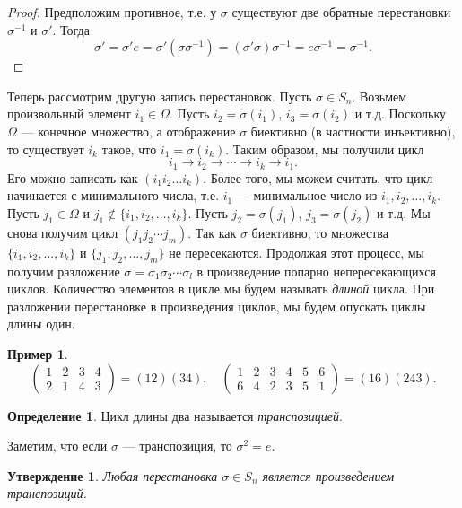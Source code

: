 \documentclass[12pt, titlepage, oneside]{amsbook}
\newtheorem{claim}[theorem]{Утверждение}
\theoremstyle{definition}
\newtheorem{example}[theorem]{Пример}
\newtheorem{definition}[theorem]{Определение}
\theoremstyle{remark}
\begin{document}
\begin{proof}
	Предположим противное, т.е. у $\sigma$ существуют две обратные перестановки $\sigma^{-1}$ и $\sigma'$. Тогда $$\sigma'=\sigma' e=\sigma'(\sigma\sigma^{-1})=(\sigma'\sigma)\sigma^{-1}=e\sigma^{-1}=\sigma^{-1}.$$
\end{proof}

Теперь рассмотрим другую запись перестановок. Пусть $\sigma\in S_n$. Возьмем произвольный элемент $i_1\in \Omega$. Пусть $i_2=\sigma(i_1)$, $i_3=\sigma(i_2)$ и т.д. Поскольку $\Omega$ --- конечное множество, а отображение $\sigma$ биективно (в частности инъективно), то существует $i_k$ такое, что $i_1=\sigma(i_k)$. Таким образом, мы получили цикл $$i_1\rightarrow i_2\rightarrow\cdots\rightarrow i_k\rightarrow i_1.$$ Его можно записать как $(i_1 i_2\ldots i_k)$. Более того, мы можем считать, что цикл начинается с минимального числа, т.е. $i_1$ --- минимальное число из $i_1,i_2,\ldots, i_k$. Пусть $j_1\in\Omega$ и $j_1\not\in\{i_1,i_2,\ldots,i_k\}$. Пусть $j_2=\sigma(j_1)$, $j_3=\sigma(j_2)$ и т.д. Мы снова получим цикл $(j_1 j_2\cdots j_m)$. Так как $\sigma$ биективно, то множества  $\{i_1,i_2,\ldots,i_k\}$ и  $\{j_1,j_2,\ldots,j_m\}$ не пересекаются. Продолжая этот процесс, мы получим разложение $\sigma=\sigma_1 \sigma_2\cdots \sigma_l$ в произведение попарно непересекающихся циклов. Количество элементов в цикле мы будем называть \emph{длиной} цикла. При разложении перестановке в произведения циклов, мы будем опускать циклы длины один.
\begin{example}
	$$\begin{pmatrix} 1 & 2 & 3 & 4 \\
                2 & 1 & 4 & 3\end{pmatrix}=(12)(34),\quad \begin{pmatrix} 1 & 2 & 3 & 4 & 5 & 6 \\
                6 & 4 & 2 & 3 & 5 & 1\end{pmatrix}=(16)(243).$$
\end{example}

\begin{definition}
	Цикл длины два называется \emph{транспозицией}.
\end{definition}

Заметим, что если $\sigma$ --- транспозиция, то $\sigma^2=e$.

\begin{claim}
	\label{Pod2}
	Любая перестановка $\sigma\in S_n$ является произведением транспозиций.
\end{claim}
\end{document}
